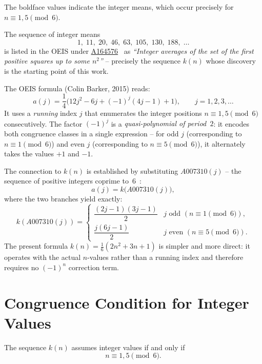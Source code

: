 The boldface values indicate the integer means, which occur precisely for $n \equiv 1, 5 \pmod{6}$.

\begin{bemerkung}
	The sequence of integer means
	\[
	1,\; 11,\; 20,\; 46,\; 63,\; 105,\; 130,\; 188,\;\ldots
	\]
	is listed in the OEIS under \href{https://oeis.org/A164576}{A164576}~\cite{OEIS}
	as \emph{``Integer averages of the set of the first positive
		squares up to some $n^2$''} -- precisely the sequence $k(n)$ whose discovery
	is the starting point of this work.
	
	The OEIS formula (Colin Barker, 2015) reads:
	\[
	a(j) = \frac{1}{4}\bigl(12j^2 - 6j + (-1)^j(4j-1) + 1\bigr),
	\qquad j = 1, 2, 3, \ldots
	\]
	It uses a \emph{running} index $j$ that enumerates the integer
	positions $n \equiv 1, 5 \pmod{6}$ consecutively.
	The factor $(-1)^j$ is a \emph{quasi-polynomial of period~$2$}:
	it encodes both congruence classes in a single expression -- for
	odd $j$ (corresponding to $n \equiv 1 \pmod{6}$) and even $j$
	(corresponding to $n \equiv 5 \pmod{6}$), it alternately takes the values
	$+1$ and $-1$.
	
	The connection to $k(n)$ is established by substituting
	$A007310(j)$ -- the sequence of positive integers coprime
	to~$6$~\cite{OEIS}:
	\[
	a(j) = k\!\bigl(A007310(j)\bigr),
	\]
	where the two branches yield exactly:
	\[
	k(A007310(j)) =
	\begin{cases}
		\dfrac{(2j-1)(3j-1)}{2} & j \text{ odd } (n \equiv 1 \pmod{6}), \\[8pt]
		\dfrac{j(6j-1)}{2}      & j \text{ even }   (n \equiv 5 \pmod{6}).
	\end{cases}
	\]
	The present formula $k(n) = \tfrac{1}{6}(2n^2+3n+1)$
	is simpler and more direct: it operates with the actual
	$n$-values rather than a running index and therefore requires
	no $(-1)^n$ correction term.
\end{bemerkung}

\clearpage

\section{Congruence Condition for Integer Values}

\begin{satz}
The sequence $k(n)$ assumes integer values if and only if
\begin{equation}
n \equiv 1, 5 \pmod{6}.
\end{equation}
\end{satz}

